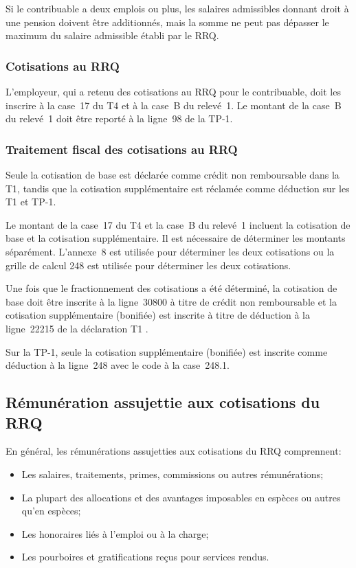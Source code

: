 \begin{note}
	Si le contribuable a deux emplois ou plus, les salaires admissibles donnant droit à une pension doivent être additionnés, mais la somme ne peut pas dépasser le maximum du salaire admissible établi par le RRQ.
\end{note}

\subsubsection{Cotisations au RRQ}
L'employeur, qui a retenu des cotisations au RRQ pour le contribuable, doit les inscrire à la case~17 du T4 et à la case~B du relevé~1. Le montant de la case~B du relevé~1 doit être reporté à la ligne~98 de la TP-1.

\subsubsection{Traitement fiscal des cotisations au RRQ}
Seule la cotisation de base est déclarée comme crédit non remboursable dans la T1, tandis que la cotisation supplémentaire est réclamée comme déduction sur les T1 et TP-1.

Le montant de la case~17 du T4 et la case~B du relevé~1 incluent la cotisation de base et la cotisation supplémentaire. Il est nécessaire de déterminer les montants séparément. L'annexe~8 est utilisée pour déterminer les deux cotisations ou la grille de calcul 248 est utilisée pour déterminer les deux cotisations.

Une fois que le fractionnement des cotisations a été déterminé, la cotisation de base doit être inscrite à la ligne~30800 à titre de crédit non remboursable et la cotisation supplémentaire (bonifiée) est inscrite à titre de déduction à la ligne~22215 de la déclaration T1 .

Sur la TP-1, seule la cotisation supplémentaire (bonifiée) est inscrite comme déduction à la ligne~248 avec le code  \fg{} à la case~248.1.


\subsection{Rémunération assujettie aux cotisations du RRQ}
En général, les rémunérations assujetties aux cotisations du RRQ comprennent:
\begin{itemize}
	\item Les salaires, traitements, primes, commissions ou autres rémunérations;
	\item La plupart des allocations et des avantages imposables en espèces ou autres qu'en espèces;
	\item Les honoraires liés à l'emploi ou à la charge; 
	\item Les pourboires et gratifications reçus pour services rendus.
\end{itemize}

